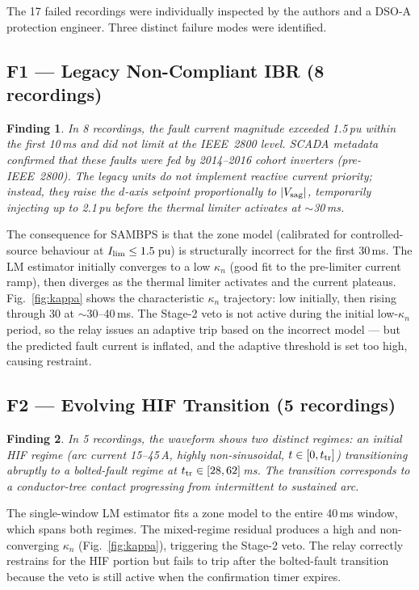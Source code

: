 \documentclass[journal]{IEEEtran}
\newtheorem{finding}{Finding}
\newcommand{\kappan}{\kappa_{n}}
\begin{document}
The 17 failed recordings were individually inspected by the authors and
a DSO-A protection engineer.  Three distinct failure modes were identified.

\subsection{F1 — Legacy Non-Compliant IBR (8 recordings)}

\begin{finding}
In 8 recordings, the fault current magnitude exceeded 1.5\,pu within the
first 10\,ms and did not limit at the IEEE~2800 level.  SCADA metadata
confirmed that these faults were fed by 2014--2016 cohort inverters
(pre-IEEE~2800).  The legacy units do not implement reactive current
priority; instead, they raise the $d$-axis setpoint proportionally to
$|V_{\rm sag}|$, temporarily injecting up to 2.1\,pu before the thermal
limiter activates at $\sim$30\,ms.
\end{finding}

The consequence for SAMBPS is that the zone model (calibrated for
controlled-source behaviour at $I_{\rm lim} \leq 1.5$\,pu) is
structurally incorrect for the first 30\,ms.  The LM estimator initially
converges to a low $\kappan$ (good fit to the pre-limiter current ramp),
then diverges as the thermal limiter activates and the current plateaus.
Fig.~\ref{fig:kappa} shows the characteristic $\kappan$ trajectory: low
initially, then rising through 30 at $\sim$30--40\,ms.  The Stage-2 veto
is not active during the initial low-$\kappan$ period, so the relay
issues an adaptive trip based on the incorrect model — but the predicted
fault current is inflated, and the adaptive threshold is set too high,
causing restraint.

\subsection{F2 — Evolving HIF Transition (5 recordings)}

\begin{finding}
In 5 recordings, the waveform shows two distinct regimes: an initial
HIF regime (arc current 15--45\,A, highly non-sinusoidal,
$t \in [0, t_{\rm tr}]$) transitioning abruptly to a bolted-fault regime
at $t_{\rm tr} \in [28, 62]$\,ms.  The transition corresponds to a
conductor-tree contact progressing from intermittent to sustained arc.
\end{finding}

The single-window LM estimator fits a zone model to the entire 40\,ms
window, which spans both regimes.  The mixed-regime residual produces a
high and non-converging $\kappan$ (Fig.~\ref{fig:kappa}), triggering the
Stage-2 veto.  The relay correctly restrains for the HIF portion but
fails to trip after the bolted-fault transition because the veto is still
active when the confirmation timer expires.
\end{document}
